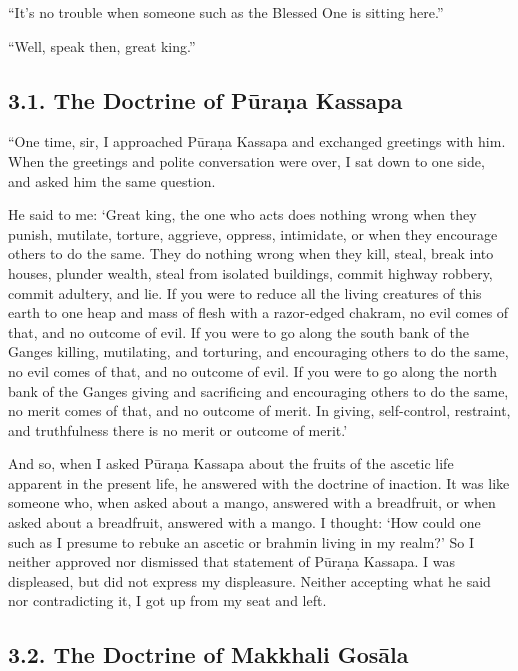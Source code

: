 \documentclass[12pt,openany]{book}%
\begin{document}
“It’s no trouble when someone such as the Blessed One is sitting here.” 

“Well, speak then, great king.” 

\subsection*{3.1. The Doctrine of \textsanskrit{Pūraṇa} Kassapa }

“One time, sir, I approached \textsanskrit{Pūraṇa} Kassapa and exchanged greetings with him. When the greetings and polite conversation were over, I sat down to one side, and asked him the same question. 

He said to me: ‘Great king, the one who acts does nothing wrong when they punish, mutilate, torture, aggrieve, oppress, intimidate, or when they encourage others to do the same. They do nothing wrong when they kill, steal, break into houses, plunder wealth, steal from isolated buildings, commit highway robbery, commit adultery, and lie. If you were to reduce all the living creatures of this earth to one heap and mass of flesh with a razor-edged chakram, no evil comes of that, and no outcome of evil. If you were to go along the south bank of the Ganges killing, mutilating, and torturing, and encouraging others to do the same, no evil comes of that, and no outcome of evil. If you were to go along the north bank of the Ganges giving and sacrificing and encouraging others to do the same, no merit comes of that, and no outcome of merit. In giving, self-control, restraint, and truthfulness there is no merit or outcome of merit.’ 

And so, when I asked \textsanskrit{Pūraṇa} Kassapa about the fruits of the ascetic life apparent in the present life, he answered with the doctrine of inaction. It was like someone who, when asked about a mango, answered with a breadfruit, or when asked about a breadfruit, answered with a mango. I thought: ‘How could one such as I presume to rebuke an ascetic or brahmin living in my realm?’ So I neither approved nor dismissed that statement of \textsanskrit{Pūraṇa} Kassapa. I was displeased, but did not express my displeasure. Neither accepting what he said nor contradicting it, I got up from my seat and left. 

\subsection*{3.2. The Doctrine of Makkhali \textsanskrit{Gosāla} }
\end{document}
